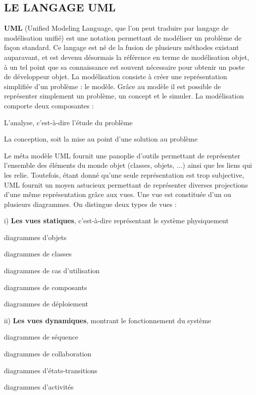  \subsection{LE LANGAGE UML}
 \textbf{UML} (Unified Modeling Language, que l’on peut traduire par langage de modélisation unifié) est une notation permettant de modéliser un problème de façon standard. Ce langage est né de la fusion de plusieurs méthodes existant auparavant, et est devenu désormais la référence en terme de modélisation objet, à un tel point que sa connaissance est souvent nécessaire pour obtenir un poste de développeur objet. La modélisation consiste à créer une représentation simplifiée d’un problème : le modèle. Grâce au modèle il est possible de représenter simplement un problème, un concept et le simuler. La modélisation comporte deux composantes :
 \begin{list}{•}{ }
 \item L’analyse, c’est-à-dire l’étude du problème
 \item La conception, soit la mise au point d’une solution au problème\\
 \end{list}

Le méta modèle UML fournit une panoplie d’outils permettant de représenter l’ensemble des éléments du monde objet (classes, objets, ...) ainsi que les liens qui les relie. Toutefois, étant donné qu’une seule représentation est trop subjective, UML fournit un moyen astucieux permettant de représenter diverses projections d’une même représentation grâce aux vues. Une vue est constituée d’un ou plusieurs diagrammes. On distingue deux types de vues :

i)	\textbf{Les vues statiques}, c’est-à-dire représentant le système physiquement
	\begin{list}{•}{ }
		\item diagrammes d’objets
		\item diagrammes de classes
		\item diagrammes de cas d’utilisation
		\item diagrammes de composants
		\item diagrammes de déploiement\\
	\end{list}
	 
ii)	\textbf{Les vues dynamiques}, montrant le fonctionnement du système
\begin{list}{•}{ }
		\item diagrammes de séquence
		\item diagrammes de collaboration
		\item diagrammes d’états-transitions
		\item diagrammes d’activités
	\end{list}

